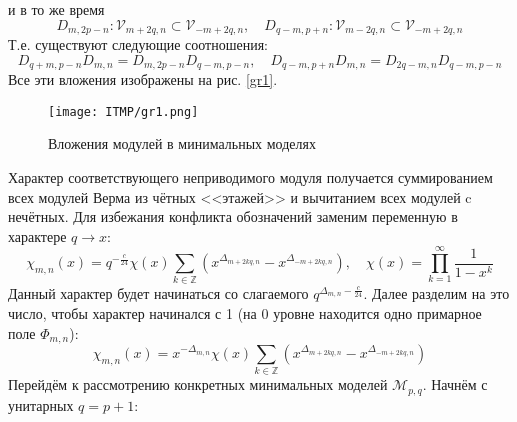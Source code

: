 \documentclass[12pt]{article}
\theoremstyle{definition}
\begin{document}
и в то же время
\begin{equation}
    D_{m,2p-n}:\mathcal{V}_{m+2q,n}\subset\mathcal{V}_{-m+2q,n},\quad D_{q-m,p+n}:\mathcal{V}_{m-2q,n}\subset\mathcal{V}_{-m+2q,n}
\end{equation}
Т.е. существуют следующие соотношения:
\begin{equation}
    D_{q+m,p-n}D_{m,n}=D_{m,2p-n}D_{q-m,p-n},\quad D_{q-m,p+n}D_{m,n}=D_{2q-m,n}D_{q-m,p-n}
\end{equation}
Все эти вложения изображены на рис. \ref{gr1}.\\
\begin{figure}\label{gr1}
    \centering
    \texttt{[image: ITMP/gr1.png]}
    \caption{Вложения модулей в минимальных моделях}
    \label{fig:enter-label}
\end{figure}
Характер соответствующего неприводимого модуля получается суммированием всех модулей Верма из чётных <<этажей>> и вычитанием всех модулей c нечётных. Для избежания конфликта обозначений заменим переменную в характере $q\rightarrow x$:
\begin{equation}
    \chi_{m,n}(x)=q^{-\frac{c}{24}}\chi(x)\sum\limits_{k\in\mathbb{Z}}(x^{\Delta_{m+2kq,n}}-x^{\Delta_{-m+2kq,n}}),\quad\chi(x)=\prod\limits_{k=1}^\infty\frac{1}{1-x^k}
\end{equation}
Данный характер будет начинаться со слагаемого $q^{\Delta_{m,n}-\frac{c}{24}}$. Далее разделим на это число, чтобы характер начинался с 1 (на 0 уровне находится одно примарное поле $\Phi_{m,n}$):
\begin{equation}
    \chi_{m,n}(x)=x^{-\Delta_{m,n}}\chi(x)\sum\limits_{k\in\mathbb{Z}}(x^{\Delta_{m+2kq,n}}-x^{\Delta_{-m+2kq,n}})
\end{equation}
Перейдём к рассмотрению конкретных минимальных моделей $\mathcal{M}_{p,q}$. Начнём с унитарных $q=p+1$:
\end{document}
